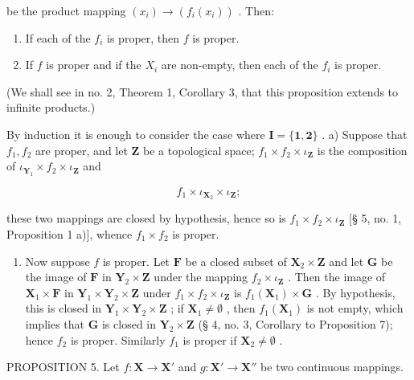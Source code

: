 be the product mapping \((x_{i})\to (f_{i}(x_{i}))\) . Then:

\begin{enumerate}
\def\labelenumi{\alph{enumi})}
\item
  If each of the \(f_i\) is proper, then \(f\) is proper.
\item
  If \(f\) is proper and if the \(X_i\) are non-empty, then each of the \(f_i\) is proper.
\end{enumerate}

(We shall see in no. 2, Theorem 1, Corollary 3, that this proposition extends to infinite products.)

By induction it is enough to consider the case where \(\mathbf{I} = \{\mathbf{1},\mathbf{2}\}\) . a) Suppose that \(f_{1}, f_{2}\) are proper, and let \(\mathbf{Z}\) be a topological space; \(f_{1} \times f_{2} \times \iota_{\mathbf{Z}}\) is the composition of \(\iota_{\mathbf{Y}_1} \times f_2 \times \iota_{\mathbf{Z}}\) and

\[
f _ {1} \times \iota_ {\mathbf {X} _ {2}} \times \iota_ {\mathbf {Z}};
\]

these two mappings are closed by hypothesis, hence so is \(f_{1} \times f_{2} \times \iota_{\mathbf{Z}}\) {[}§ 5, no. 1, Proposition 1 a){]}, whence \(f_{1} \times f_{2}\) is proper.

\begin{enumerate}
\def\labelenumi{\alph{enumi})}
\setcounter{enumi}{1}
\tightlist
\item
  Now suppose \(f\) is proper. Let \(\mathbf{F}\) be a closed subset of \(\mathbf{X}_2 \times \mathbf{Z}\) and let \(\mathbf{G}\) be the image of \(\mathbf{F}\) in \(\mathbf{Y}_2 \times \mathbf{Z}\) under the mapping \(f_2 \times \iota_{\mathbf{Z}}\) . Then the image of \(\mathbf{X}_1 \times \mathbf{F}\) in \(\mathbf{Y}_1 \times \mathbf{Y}_2 \times \mathbf{Z}\) under \(f_1 \times f_2 \times \iota_{\mathbf{Z}}\) is \(f_1(\mathbf{X}_1) \times \mathbf{G}\) . By hypothesis, this is closed in \(\mathbf{Y}_1 \times \mathbf{Y}_2 \times \mathbf{Z}\) ; if \(\mathbf{X}_1 \neq \emptyset\) , then \(f_1(\mathbf{X}_1)\) is not empty, which implies that \(\mathbf{G}\) is closed in \(\mathbf{Y}_2 \times \mathbf{Z}\) (§ 4, no. 3, Corollary to Proposition 7); hence \(f_2\) is proper. Similarly \(f_1\) is proper if \(\mathbf{X}_2 \neq \emptyset\) .
\end{enumerate}

PROPOSITION 5. Let \(f: \mathbf{X} \to \mathbf{X}'\) and \(g: \mathbf{X}' \to \mathbf{X}''\) be two continuous mappings.

